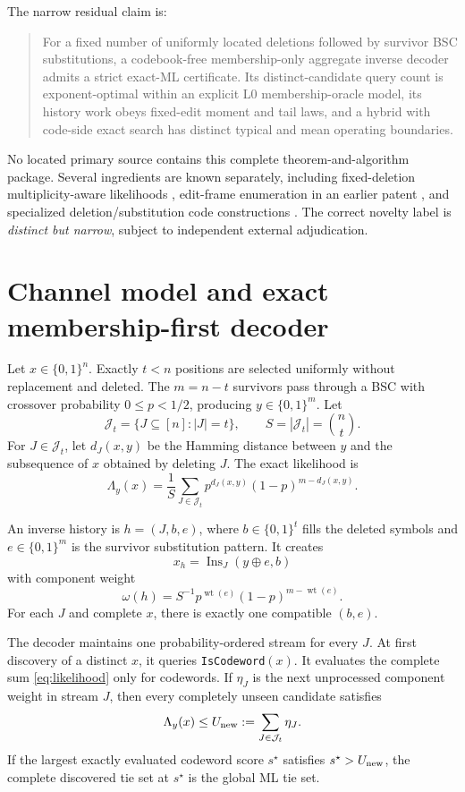 \documentclass[11pt]{article}
\theoremstyle{definition}
\theoremstyle{remark}
\newcommand{\J}{\mathcal J}
\begin{document}
The narrow residual claim is:
\begin{quote}
For a fixed number of uniformly located deletions followed by survivor BSC substitutions, a codebook-free membership-only aggregate inverse decoder admits a strict exact-ML certificate.  Its distinct-candidate query count is exponent-optimal within an explicit L0 membership-oracle model, its history work obeys fixed-edit moment and tail laws, and a hybrid with code-side exact search has distinct typical and mean operating boundaries.
\end{quote}
No located primary source contains this complete theorem-and-algorithm package.  Several ingredients are known separately, including fixed-deletion multiplicity-aware likelihoods \cite{Sabary2022}, edit-frame enumeration in an earlier patent \cite{US4922494}, and specialized deletion/substitution code constructions \cite{Song2026,PiZhang2025}.  The correct novelty label is \emph{distinct but narrow}, subject to independent external adjudication.

\section{Channel model and exact membership-first decoder}
Let $x\in\{0,1\}^n$.  Exactly $t<n$ positions are selected uniformly without replacement and deleted.  The $m=n-t$ survivors pass through a BSC with crossover probability $0\le p<1/2$, producing $y\in\{0,1\}^m$.  Let
\[
\J_t=\{J\subseteq[n]:|J|=t\},\qquad S=|\J_t|=\binom nt.
\]
For $J\in\J_t$, let $d_J(x,y)$ be the Hamming distance between $y$ and the subsequence of $x$ obtained by deleting $J$.  The exact likelihood is
\begin{equation}
\Lambda_y(x)=\frac1S\sum_{J\in\J_t}p^{d_J(x,y)}(1-p)^{m-d_J(x,y)}.
\label{eq:likelihood}
\end{equation}

An inverse history is $h=(J,b,e)$, where $b\in\{0,1\}^t$ fills the deleted symbols and $e\in\{0,1\}^m$ is the survivor substitution pattern.  It creates
\[
x_h=\operatorname{Ins}_J(y\oplus e,b)
\]
with component weight
\[
\omega(h)=S^{-1}p^{\operatorname{wt}(e)}(1-p)^{m-\operatorname{wt}(e)}.
\]
For each $J$ and complete $x$, there is exactly one compatible $(b,e)$.

The decoder maintains one probability-ordered stream for every $J$.  At first discovery of a distinct $x$, it queries \texttt{IsCodeword}$(x)$.  It evaluates the complete sum \eqref{eq:likelihood} only for codewords.  If $\eta_J$ is the next unprocessed component weight in stream $J$, then every completely unseen candidate satisfies
\begin{equation}
\Lambda_y(x)\le U_{\rm new}:=\sum_{J\in\J_t}\eta_J.
\label{eq:unseen}
\end{equation}
If the largest exactly evaluated codeword score $s^\star$ satisfies $s^\star>U_{\rm new}$, the complete discovered tie set at $s^\star$ is the global ML tie set.
\end{document}
